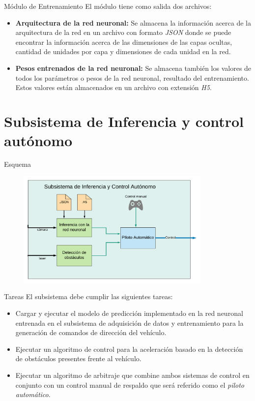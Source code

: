 \documentclass[10pt]{beamer}
\begin{document}
\begin{frame}{Módulo de Entrenamiento}
    El módulo tiene como salida dos archivos:

    \begin{itemize}
        \item \textbf{Arquitectura de la red neuronal:} Se almacena la información acerca de la arquitectura de la red en un archivo con formato \emph{JSON} donde se puede encontrar la información acerca de las dimensiones de las capas ocultas, cantidad de unidades por capa y dimensiones de cada unidad en la red.
        \item \textbf{Pesos entrenados de la red neuronal:} Se almacena también los valores de todos los parámetros o pesos de la red neuronal, resultado del entrenamiento. Estos valores están almacenados en un archivo con extensión \emph{H5}. 
    \end{itemize}

\end{frame}


\section{Subsistema de Inferencia y control autónomo}
\begin{frame}{Esquema}
    \begin{figure}[!h] 
        \centering
        \includegraphics[width=0.85\textwidth]{../img/inferencia_esq}
        \end{figure}
\end{frame}

\begin{frame}{Tareas}
    El subsistema debe cumplir las siguientes tareas:
    \begin{itemize}
        \item Cargar y ejecutar el modelo de predicción implementado en la red neuronal entrenada en el subsistema de adquisición de datos y entrenamiento para la generación de comandos de dirección del vehículo.
        \item Ejecutar un algoritmo de control para la aceleración basado en la detección de obstáculos presentes frente al vehículo.
        \item Ejecutar un algoritmo de arbitraje que combine ambos sistemas de control en conjunto con un control manual de respaldo que será referido como el \textit{piloto automático}.
    \end{itemize} 
\end{frame}
\end{document}
